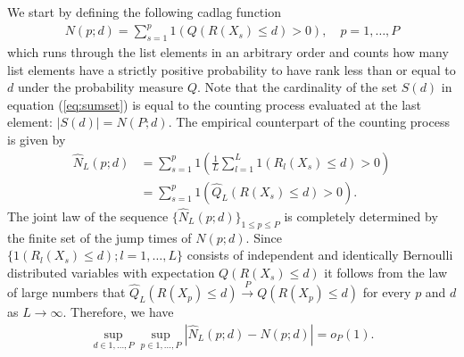 \documentclass[12pt,a4paper]{article}
\newcommand{\nn}{\nonumber}
\theoremstyle{plain}
\begin{document}
We start by defining the following cadlag function
\begin{align}
  N(p; d) = \sum_{s=1}^p 1\left(Q(R(X_s) \leq d) > 0\right), \quad p = 1,\ldots, P
\end{align}
which runs through the list elements in an arbitrary order and counts
how many list elements have a strictly positive probability to have
rank less than or equal to $d$ under the probability measure $Q$.
Note that the cardinality of the set $S(d)$ in equation
(\ref{eq:sumset}) is equal to the counting process evaluated at the last element: $|S(d)| = N(P;d)$.
The empirical counterpart of the counting process is given by
\begin{align}
  \widehat{N}_L(p; d) &= \sum_{s=1}^p 1\left( \frac{1}{L} \sum_{l=1}^L 1(R_l(X_s) \leq d) > 0\right)\\
        &= \sum_{s=1}^p 1\left(\widehat{Q}_L(R(X_s) \leq d) > 0\right)\nn.
\end{align}
The joint law of the sequence
$\{\widehat{N}_L(p;d)\}_{1\leq p \leq P}$ is completely determined by
the finite set of the jump times of $N(p;d)$. Since
$\{1(R_l(X_s) \leq d); l=1,\dots, L\}$ consists of independent and
identically Bernoulli distributed variables with expectation
$Q(R(X_s) \leq d)$ it follows from the law of large numbers that
$\widehat{Q}_L(R(X_p) \leq d) \overset{P}{\longrightarrow} Q(R(X_p)
\leq d)$ for every $p$ and $d$ as $L \rightarrow \infty$. 
Therefore, we have
\begin{align}
  \sup_{d \in 1,\ldots,P}\sup_{p \in 1,\ldots, P} \left|\widehat{N}_L(p; d) - N(p; d)\right| = o_P(1).\label{eq:countingConv}
\end{align}
\end{document}
